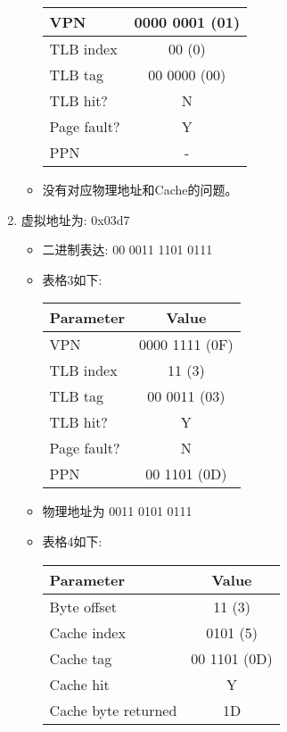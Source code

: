 \documentclass[a4paper,11pt]{article}
\begin{document}
\begin{enumerate}
\begin{itemize}
\begin{center}
\begin{tabular}{l|c}
			VPN & 0000 0001 (01) \\ \hline
			TLB index & 00 (0) \\ \hline
			TLB tag & 00 0000 (00) \\ \hline
			TLB hit? & N \\ \hline
			Page fault? & Y \\ \hline
			PPN & - \\ \hline
		\end{tabular}
	\end{center}
	\item 没有对应物理地址和Cache的问题。
\end{itemize}
\item 虚拟地址为: 0x03d7 \\
\begin{itemize}
	\item 二进制表达: 00 0011 1101 0111
	\item 
	表格3如下:
	\begin{center}
		\begin{tabular}{l|c} \hline
			Parameter & Value \\ \hline
			VPN &  0000 1111 (0F) \\ \hline
			TLB index & 11 (3) \\ \hline
			TLB tag & 00 0011 (03) \\ \hline
			TLB hit? & Y \\ \hline
			Page fault? & N \\ \hline
			PPN & 00 1101 (0D) \\ \hline
		\end{tabular}
	\end{center}
	\item 物理地址为 0011 0101 0111
	\item 
	表格4如下:
	\begin{center}
		\begin{tabular}{l|c} \hline 
			Parameter & Value \\ \hline
			Byte offset & 11 (3) \\ \hline
			Cache index & 0101 (5) \\ \hline
			Cache tag & 00 1101 (0D) \\ \hline 
			Cache hit & Y \\ \hline
			Cache byte returned & 1D \\ \hline 
		\end{tabular}
	\end{center}
\end{itemize}
\end{enumerate}
\end{document}
